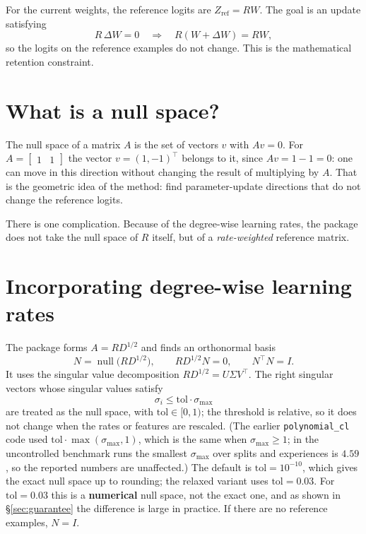 \documentclass[11pt,a4paper]{article}
\DeclareMathOperator{\Null}{null}
\newcommand{\code}[1]{\texttt{#1}}
\begin{document}
For the current weights, the reference logits are $Z_{\text{ref}}=RW$. The goal is an update satisfying
\[
R\,\Delta W=0
\quad\Longrightarrow\quad
R(W+\Delta W)=RW,
\]
so the logits on the reference examples do not change. This is the mathematical retention constraint.

\section{What is a null space?}

The null space of a matrix $A$ is the set of vectors $v$ with $Av=0$. For $A=\begin{bmatrix}1&1\end{bmatrix}$ the vector $v=(1,-1)^\top$ belongs to it, since $Av=1-1=0$: one can move in this direction without changing the result of multiplying by $A$. That is the geometric idea of the method: find parameter-update directions that do not change the reference logits.

There is one complication. Because of the degree-wise learning rates, the package does not take the null space of $R$ itself, but of a \emph{rate-weighted} reference matrix.

\section{Incorporating degree-wise learning rates}

The package forms $A=RD^{1/2}$ and finds an orthonormal basis
\[
\boxed{N=\Null\!\bigl(RD^{1/2}\bigr)},\qquad RD^{1/2}N=0,\qquad N^\top N=I.
\]
It uses the singular value decomposition $RD^{1/2}=U\Sigma V^\top$. The right singular vectors whose singular values satisfy
\[
\sigma_i\le\text{tol}\cdot\sigma_{\max}
\]
are treated as the null space, with $\text{tol}\in[0,1)$; the threshold is relative, so it does not change when the rates or features are rescaled. (The earlier \code{polynomial\_cl} code used $\text{tol}\cdot\max(\sigma_{\max},1)$, which is the same when $\sigma_{\max}\ge1$; in the uncontrolled benchmark runs the smallest $\sigma_{\max}$ over splits and experiences is $4.59$, so the reported numbers are unaffected.) The default is $\text{tol}=10^{-10}$, which gives the exact null space up to rounding; the relaxed variant uses $\text{tol}=0.03$. For $\text{tol}=0.03$ this is a \textbf{numerical} null space, not the exact one, and as shown in \S\ref{sec:guarantee} the difference is large in practice. If there are no reference examples, $N=I$.
\end{document}
